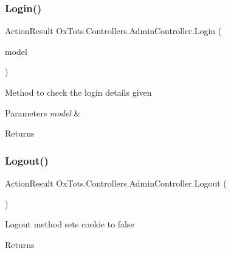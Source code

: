 \subsubsection{\texorpdfstring{Login()}{Login()}}
{\footnotesize\ttfamily Action\+Result Ox\+Tots.\+Controllers.\+Admin\+Controller.\+Login (\begin{DoxyParamCaption}\item[{Admin\+Login\+View\+Model}]{model }\end{DoxyParamCaption})\hspace{0.3cm}{\ttfamily [inline]}}



Method to check the login details given 


\begin{DoxyParams}{Parameters}
{\em model} & \\
\hline
\end{DoxyParams}
\begin{DoxyReturn}{Returns}

\end{DoxyReturn}
\mbox{\label{class_ox_tots_1_1_controllers_1_1_admin_controller_abfbe3370ec891ee42b4a842a1b294797}} 
\subsubsection{\texorpdfstring{Logout()}{Logout()}}
{\footnotesize\ttfamily Action\+Result Ox\+Tots.\+Controllers.\+Admin\+Controller.\+Logout (\begin{DoxyParamCaption}{ }\end{DoxyParamCaption})\hspace{0.3cm}{\ttfamily [inline]}}



Logout method sets cookie to false 

\begin{DoxyReturn}{Returns}

\end{DoxyReturn}
\mbox{\label{class_ox_tots_1_1_controllers_1_1_admin_controller_a477e22f8c8c613cdb4d9fd5627268f25}} 
